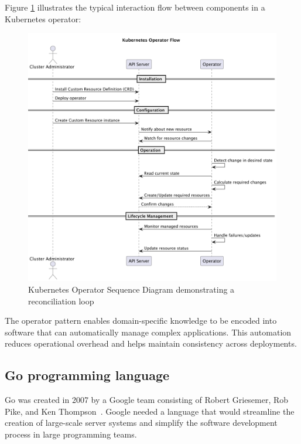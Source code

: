 Figure \ref{fig:kubernetes-operator-flow} illustrates the typical interaction flow between components in a Kubernetes operator:

\begin{figure}[htbp]
    \centering
    \includegraphics[width=\textwidth]{images/kubernetes_operator_flow.png}
    \caption{Kubernetes Operator Sequence Diagram demonstrating a reconciliation loop}
    \label{fig:kubernetes-operator-flow}
\end{figure}

The operator pattern enables domain-specific knowledge to be encoded into software that can automatically manage complex applications.
This automation reduces operational overhead and helps maintain consistency across deployments.

\subsection{Go programming language}\label{subsec:go-programming-language}

Go was created in 2007 by a Google team consisting of Robert Griesemer, Rob Pike, and Ken Thompson~\cite{golang}.
Google needed a language that would streamline the creation of large-scale server systems and simplify the software development process in large programming teams.

